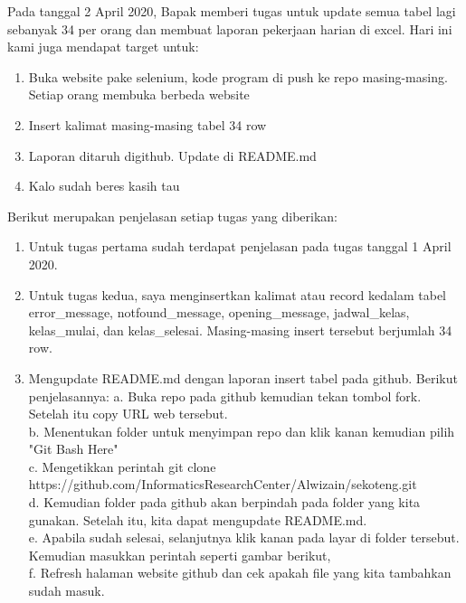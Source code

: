 \documentclass[a4paper, 12 pt]{article}
\newcounter{saveenumi}
\newcommand{\seti}{\setcounter{saveenumi}{\value{enumi}}} %
\begin{document}
            \newpage
            \par Pada tanggal 2 April 2020, Bapak memberi tugas untuk update semua tabel lagi sebanyak 34 per orang dan membuat laporan pekerjaan harian di excel. Hari ini kami juga mendapat target untuk:
		        \begin{enumerate}
                    \item Buka website pake selenium, kode program di push ke repo masing-masing. Setiap orang membuka berbeda website
                    \item Insert kalimat masing-masing tabel 34 row
                    \item Laporan ditaruh digithub. Update di README.md
                    \item Kalo sudah beres kasih tau
                    \seti %
                \end{enumerate}
            \par Berikut merupakan penjelasan setiap tugas yang diberikan:
            \begin{enumerate}
                \item Untuk tugas pertama sudah terdapat penjelasan pada tugas tanggal 1 April 2020.
                \item Untuk tugas kedua, saya menginsertkan kalimat atau record kedalam tabel error\_message, notfound\_message, opening\_message, jadwal\_kelas, kelas\_mulai, dan kelas\_selesai. Masing-masing insert tersebut berjumlah 34 row.
                \item Mengupdate README.md dengan laporan insert tabel pada github. Berikut penjelasannya:
                a. Buka repo pada github kemudian tekan tombol fork. Setelah itu copy URL web tersebut. \\
                b. Menentukan folder untuk menyimpan repo dan klik kanan kemudian pilih "Git Bash Here" \\
                c. Mengetikkan perintah git clone https://github.com/InformaticsResearchCenter/Alwizain/sekoteng.git \\
                d. Kemudian folder pada github akan berpindah pada folder yang kita gunakan. Setelah itu, kita dapat mengupdate README.md. \\
                e. Apabila sudah selesai, selanjutnya klik kanan pada layar di folder tersebut. Kemudian masukkan perintah seperti gambar berikut, \\
                f. Refresh halaman website github dan cek apakah file yang kita tambahkan sudah masuk.
                \seti
            \end{enumerate}
            
\end{document}
